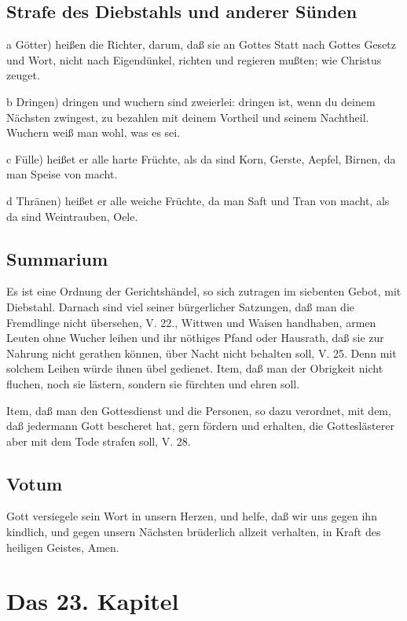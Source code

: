 \section{Strafe des Diebstahls und anderer Sünden}

a Götter) heißen die Richter, darum, daß sie an Gottes Statt nach Gottes Gesetz und Wort, nicht nach Eigendünkel, richten und regieren mußten; wie Christus zeuget.

b Dringen) dringen und wuchern sind zweierlei: dringen ist, wenn du deinem Nächsten zwingest, zu bezahlen mit deinem Vortheil und seinem Nachtheil. Wuchern weiß man wohl, was es sei.

c Fülle) heißet er alle harte Früchte, als da sind Korn, Gerste, Aepfel, Birnen, da man Speise von macht.

d Thränen) heißet er alle weiche Früchte, da man Saft und Tran von macht, als da sind Weintrauben, Oele.

\section{Summarium}

Es ist eine Ordnung der Gerichtshändel, so sich zutragen im siebenten Gebot, mit Diebstahl. Darnach sind viel seiner bürgerlicher Satzungen, daß man die Fremdlinge nicht übersehen, V. 22., Wittwen und Waisen handhaben, armen Leuten ohne Wucher leihen und ihr nöthiges Pfand oder Hausrath, daß sie zur Nahrung nicht gerathen können, über Nacht nicht behalten soll, V. 25. Denn mit solchem Leihen würde ihnen übel gedienet. Item, daß man der Obrigkeit nicht fluchen, noch sie lästern, sondern sie fürchten und ehren soll.

Item, daß man den Gottesdienst und die Personen, so dazu verordnet, mit dem, daß jedermann Gott bescheret hat, gern fördern und erhalten, die Gotteslästerer aber mit dem Tode strafen soll, V. 28.

\section{Votum}

Gott versiegele sein Wort in unsern Herzen, und helfe, daß wir uns gegen ihn kindlich, und gegen unsern Nächsten brüderlich allzeit verhalten, in Kraft des heiligen Geistes, Amen.

\chapter{Das 23. Kapitel}

